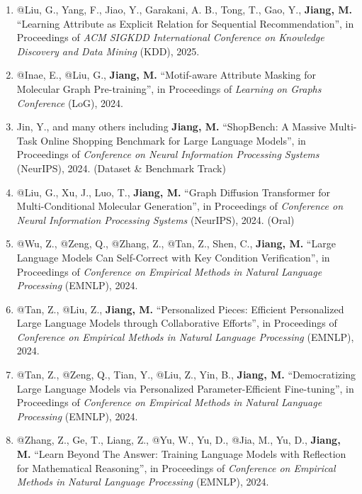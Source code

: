 \documentclass[10pt]{article}
\newenvironment{myindentpar}[1]%
{\begin{list}{}%
         {\setlength{\leftmargin}{#1}}%
         \item[]%
}
{\end{list}}
\newcounter{list}
\begin{document}
\begin{myindentpar}{0.00cm}
\begin{enumerate}[leftmargin=.5cm]
\item[C102] @Liu, G., Yang, F., Jiao, Y., Garakani, A. B., Tong, T., Gao, Y., \textbf{Jiang, M.} ``Learning Attribute as Explicit Relation for Sequential Recommendation'', in Proceedings of \textit{ACM SIGKDD International Conference on Knowledge Discovery and Data Mining} (KDD), 2025.
		
\item[C101] @Inae, E., @Liu, G., \textbf{Jiang, M.} ``Motif-aware Attribute Masking for Molecular Graph Pre-training'', in Proceedings of \textit{Learning on Graphs Conference} (LoG), 2024.
		
\item[C100] Jin, Y., and many others including \textbf{Jiang, M.} ``ShopBench: A Massive Multi-Task Online Shopping Benchmark for Large Language Models'', in Proceedings of \textit{Conference on Neural Information Processing Systems} (NeurIPS), 2024. (Dataset \& Benchmark Track)

\item[C99] @Liu, G., Xu, J., Luo, T., \textbf{Jiang, M.} ``Graph Diffusion Transformer for Multi-Conditional Molecular Generation'', in Proceedings of \textit{Conference on Neural Information Processing Systems} (NeurIPS), 2024. (Oral)

\item[C98] @Wu, Z., @Zeng, Q., @Zhang, Z., @Tan, Z., Shen, C., \textbf{Jiang, M.} ``Large Language Models Can Self-Correct with Key Condition Verification'', in Proceedings of \textit{Conference on Empirical Methods in Natural Language Processing} (EMNLP), 2024.

\item[C97] @Tan, Z., @Liu, Z., \textbf{Jiang, M.} ``Personalized Pieces: Efficient Personalized Large Language Models through Collaborative Efforts'', in Proceedings of \textit{Conference on Empirical Methods in Natural Language Processing} (EMNLP), 2024.

\item[C96] @Tan, Z., @Zeng, Q., Tian, Y., @Liu, Z., Yin, B., \textbf{Jiang, M.} ``Democratizing Large Language Models via Personalized Parameter-Efficient Fine-tuning'', in Proceedings of \textit{Conference on Empirical Methods in Natural Language Processing} (EMNLP), 2024.

\item[C95] @Zhang, Z., Ge, T., Liang, Z., @Yu, W., Yu, D., @Jia, M., Yu, D., \textbf{Jiang, M.} ``Learn Beyond The Answer: Training Language Models with Reflection for Mathematical Reasoning'', in Proceedings of \textit{Conference on Empirical Methods in Natural Language Processing} (EMNLP), 2024.


\end{enumerate}
\end{myindentpar}
\end{document}
